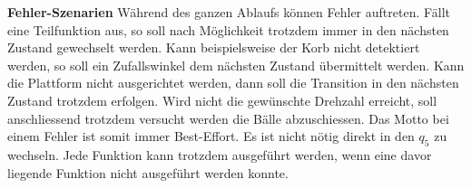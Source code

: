\noindent
\textbf{Fehler-Szenarien}
Während des ganzen Ablaufs können Fehler auftreten. Fällt eine Teilfunktion aus, so soll nach Möglichkeit trotzdem immer in den nächsten Zustand gewechselt werden. Kann beispielsweise der Korb nicht detektiert werden, so soll ein Zufallswinkel dem nächsten Zustand übermittelt werden. Kann die Plattform nicht ausgerichtet werden, dann soll die Transition in den nächsten Zustand trotzdem erfolgen. Wird nicht die gewünschte Drehzahl erreicht, soll anschliessend trotzdem versucht werden die Bälle abzuschiessen. Das Motto bei einem Fehler ist somit immer Best-Effort. Es ist nicht nötig direkt in den $q_{5}$ zu wechseln. Jede Funktion kann trotzdem ausgeführt werden, wenn eine davor liegende Funktion nicht ausgeführt werden konnte.
